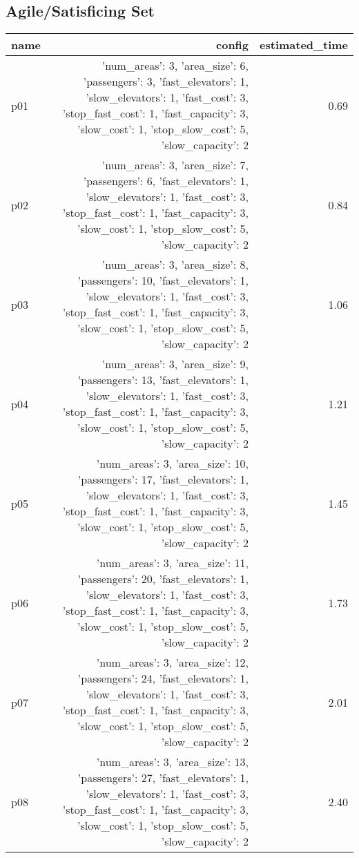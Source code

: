 \documentclass{article}
\begin{document}
                                \subsection*{Agile/Satisficing Set}
                                
                            \begin{center}
                            \scriptsize
                            \begin{tabular}{@{}l|r|r@{}}
                            name & config & estimated\_time\\\midrule
                              p01&{'num\_areas': 3, 'area\_size': 6, 'passengers': 3, 'fast\_elevators': 1, 'slow\_elevators': 1, 'fast\_cost': 3, 'stop\_fast\_cost': 1, 'fast\_capacity': 3, 'slow\_cost': 1, 'stop\_slow\_cost': 5, 'slow\_capacity': 2}&0.69\\
  p02&{'num\_areas': 3, 'area\_size': 7, 'passengers': 6, 'fast\_elevators': 1, 'slow\_elevators': 1, 'fast\_cost': 3, 'stop\_fast\_cost': 1, 'fast\_capacity': 3, 'slow\_cost': 1, 'stop\_slow\_cost': 5, 'slow\_capacity': 2}&0.84\\
  p03&{'num\_areas': 3, 'area\_size': 8, 'passengers': 10, 'fast\_elevators': 1, 'slow\_elevators': 1, 'fast\_cost': 3, 'stop\_fast\_cost': 1, 'fast\_capacity': 3, 'slow\_cost': 1, 'stop\_slow\_cost': 5, 'slow\_capacity': 2}&1.06\\
  p04&{'num\_areas': 3, 'area\_size': 9, 'passengers': 13, 'fast\_elevators': 1, 'slow\_elevators': 1, 'fast\_cost': 3, 'stop\_fast\_cost': 1, 'fast\_capacity': 3, 'slow\_cost': 1, 'stop\_slow\_cost': 5, 'slow\_capacity': 2}&1.21\\
  p05&{'num\_areas': 3, 'area\_size': 10, 'passengers': 17, 'fast\_elevators': 1, 'slow\_elevators': 1, 'fast\_cost': 3, 'stop\_fast\_cost': 1, 'fast\_capacity': 3, 'slow\_cost': 1, 'stop\_slow\_cost': 5, 'slow\_capacity': 2}&1.45\\
  p06&{'num\_areas': 3, 'area\_size': 11, 'passengers': 20, 'fast\_elevators': 1, 'slow\_elevators': 1, 'fast\_cost': 3, 'stop\_fast\_cost': 1, 'fast\_capacity': 3, 'slow\_cost': 1, 'stop\_slow\_cost': 5, 'slow\_capacity': 2}&1.73\\
  p07&{'num\_areas': 3, 'area\_size': 12, 'passengers': 24, 'fast\_elevators': 1, 'slow\_elevators': 1, 'fast\_cost': 3, 'stop\_fast\_cost': 1, 'fast\_capacity': 3, 'slow\_cost': 1, 'stop\_slow\_cost': 5, 'slow\_capacity': 2}&2.01\\
  p08&{'num\_areas': 3, 'area\_size': 13, 'passengers': 27, 'fast\_elevators': 1, 'slow\_elevators': 1, 'fast\_cost': 3, 'stop\_fast\_cost': 1, 'fast\_capacity': 3, 'slow\_cost': 1, 'stop\_slow\_cost': 5, 'slow\_capacity': 2}&2.40\\

\end{tabular}
\end{center}
\end{document}
